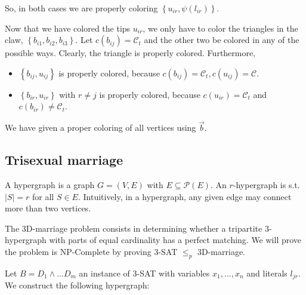 \documentclass[a4paper, 12pt]{article}
\begin{document}
So, in both cases we are properly coloring $\left\{ u_{ir}, \psi(l_{ir})
\right\} $.

Now that we have colored the tips $u_{ir}$, we only have to color the triangles
in the claw, $\left\{ b_{i 1}, b_{i 2}, b_{i 3} \right\} $. Let $c(b_{ij}) =
\mathcal{C}_t$ and the other two be colored in any of the possible ways. Clearly, the triangle is properly colored. Furthermore, 

\begin{itemize}
    \item $\left\{ b_{ij}, u_{ij} \right\} $ is properly colored, because $c(b_{ij}) = \mathcal{C}_t, c(u_{ij}) = \mathcal{C}$. 

    \item $\left\{ b_{ir}, u_{ir} \right\} $ with $r \neq j$ is properly colored, because $c(u_{ir}) = \mathcal{C}_t$ and $c(b_{ir}) \neq \mathcal{C}_t$.
\end{itemize}

We have given a proper coloring of all vertices using $\overrightarrow{b}$.

\subsection{Trisexual marriage}

A hypergraph is a graph $G = (V, E) $ with $E \subseteq \mathcal{P}(E)$. An
$r$-hypergraph is s.t. $|S| = r$ for all $S \in E$. Intuitively, in a
hypergraph, any given edge may connect more than two vertices.

The 3D-marriage problem consists in determining whether a tripartite
$3$-hypergraph with parts of equal cardinality has a perfect matching.
We will prove the problem is NP-Complete by proving $3$-SAT $\leq_p$ 3D-marriage.

Let $B = D_1 \land  \ldots D_m$ an instance of $3$-SAT with variables 
$x_1, \ldots, x_n$ and literals $l_{jr}$. We construct the 
following hypergraph:
\end{document}
